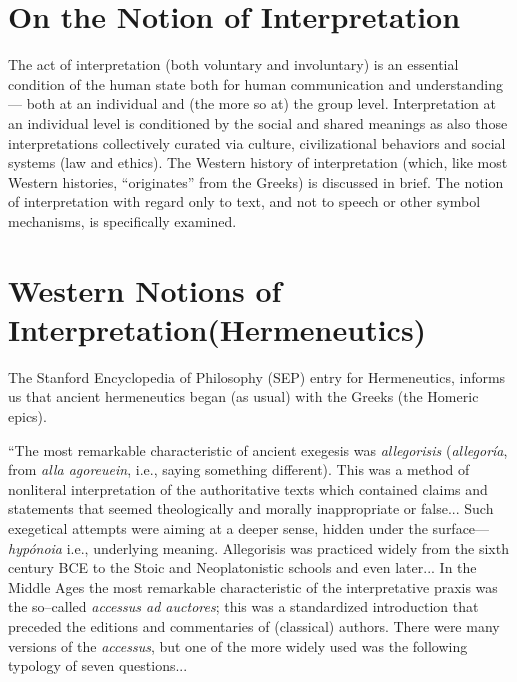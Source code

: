 \section*{On the Notion of Interpretation}

The act of interpretation (both voluntary and involuntary) is an essential condition of the human state both for human communication and understanding — both at an individual and (the more so at) the group level. Interpretation at an individual level is conditioned by the social and shared meanings as also those interpretations collectively curated via culture, civilizational behaviors and social systems (law and ethics). The Western history of interpretation (which, like most Western histories, “originates” from the Greeks) is discussed in brief. The notion of interpretation with regard only to text, and not to speech or other symbol mechanisms, is specifically examined.


\section*{Western Notions of Interpretation\hfil \break (Hermeneutics)}

The Stanford Encyclopedia of Philosophy (SEP) entry for Herme\-neutics, informs us that ancient hermeneutics began (as usual) with the Greeks (the Homeric epics).

\begin{myquote}
“The most remarkable characteristic of ancient exegesis was \textit{allegorisis} (\textit{allegoría}, from \textit{alla agoreuein}, i.e., saying something different). This was a method of nonliteral interpretation of the authoritative texts which contained claims and statements that seemed theologically and morally inappropriate or false... Such exegetical attempts were aiming at a deeper sense, hidden under the surface—\textit{hypónoia} i.e., underlying meaning. Allegorisis was practiced widely from the sixth century BCE to the Stoic and Neoplatonistic schools and even later... In the Middle Ages the most remarkable characteristic of the interpretative praxis was the so–called \textit{accessus ad auctores}; this was a standardized introduction that preceded the editions and commentaries of (classical) authors. There were many versions of the \textit{accessus}, but one of the more widely used was the following typology of seven questions...
\end{myquote}

